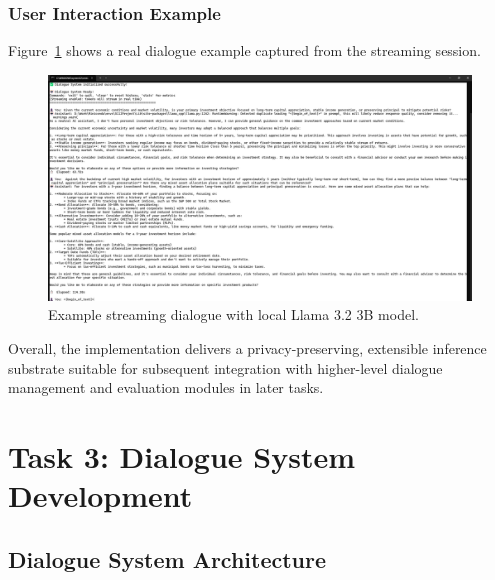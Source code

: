 \documentclass[12pt,a4paper]{article}
\begin{document}
\subsubsection*{User Interaction Example}

Figure~\ref{fig:llama_chat_screenshot} shows a real dialogue example captured from the streaming session.

\begin{figure}[H]
    \centering
    \includegraphics[width=1\linewidth]{Figures/llama对话.png}
    \caption{Example streaming dialogue with local Llama 3.2 3B model.}
    \label{fig:llama_chat_screenshot}
\end{figure}

Overall, the implementation delivers a privacy-preserving, extensible inference substrate suitable for subsequent integration with higher-level dialogue management and evaluation modules in later tasks.




\section{Task 3: Dialogue System Development}


\subsection{Dialogue System Architecture}
\end{document}

